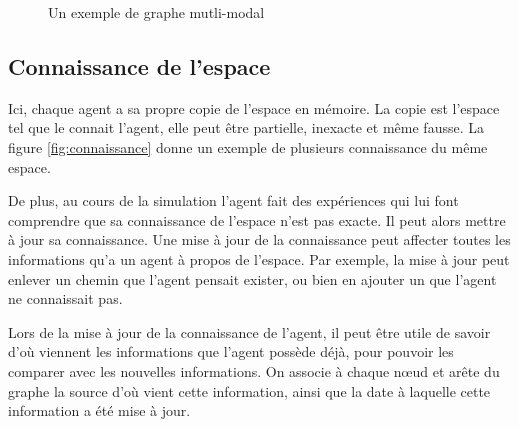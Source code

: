\documentclass[a4paper]{article}
\begin{document}
\begin{figure}
  \caption{Un exemple de graphe mutli-modal}
  \label{fig:multimodal}
  \centering
\end{figure}

  \subsection{Connaissance de l'espace}

Ici, chaque agent a sa propre copie de l'espace en mémoire. La copie est
l'espace tel que le connait l'agent, elle peut être partielle, inexacte et même
fausse. La figure \ref{fig:connaissance} donne un exemple de plusieurs
connaissance du même espace.

De plus, au cours de la simulation l'agent fait des expériences qui lui
font comprendre que sa connaissance de l'espace n'est pas exacte. Il peut
alors mettre à jour sa connaissance. Une mise à jour de la connaissance peut
affecter toutes les informations qu'a un agent à propos de l'espace. Par
exemple, la mise à jour peut enlever un chemin que l'agent pensait exister,
ou bien en ajouter un que l'agent ne connaissait pas.

Lors de la mise à jour de la connaissance de l'agent, il peut être utile de
savoir d'où viennent les informations que l'agent possède déjà, pour pouvoir les
comparer avec les nouvelles informations. On associe à chaque nœud et arête du
graphe la source d'où vient cette information, ainsi que la date à laquelle
cette information a été mise à jour.
\end{document}
